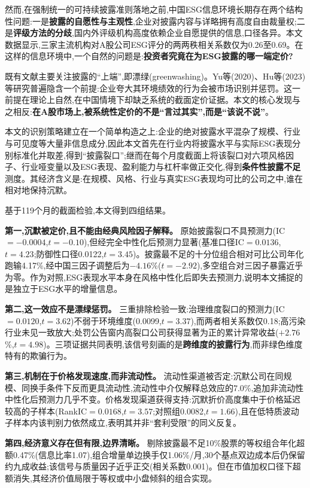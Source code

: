 \documentclass[UTF8, a4paper, fontset=fandol, zihao=-4]{ctexart}
\begin{document}
然而,在强制统一的可持续披露准则落地之前,中国ESG信息环境长期存在两个结构性问题:一是\textbf{披露的自愿性与主观性},企业对披露内容与详略拥有高度自由裁量权;二是\textbf{评级方法的分歧},国内外评级机构高度依赖企业自愿提供的信息,口径各异。本文数据显示,三家主流机构对A股公司ESG评分的两两秩相关系数仅为0.26至0.69。在这样的信息环境中,一个自然的问题是:\textbf{投资者究竟在为ESG披露的哪一端定价?}

既有文献主要关注披露的“上端”,即漂绿(greenwashing)。Yu等(2020)、Hu等(2023)等研究普遍隐含一个前提:企业夸大其环境绩效的行为会被市场识别并惩罚。这一前提在理论上自然,在中国情境下却缺乏系统的截面定价证据。本文的核心发现与之相反:\textbf{在A股市场上,被系统性定价的不是“言过其实”,而是“该说不说”}。

本文的识别策略建立在一个简单构造之上:企业的绝对披露水平混杂了规模、行业与可见度等大量非信息成分,因此本文首先在行业内将披露水平与实际ESG表现分别标准化并取差,得到“披露裂口”;继而在每个月度截面上将该裂口对六项风格因子、行业哑变量以及ESG表现、盈利能力与杠杆率做正交化,得到\textbf{条件性披露不足}测度。其经济含义是:在规模、风格、行业与真实ESG表现均可比的公司之中,谁在相对地保持沉默。

基于119个月的截面检验,本文得到四组结果。

\textbf{第一,沉默被定价,且不能由经典风险因子解释。} 原始披露裂口不具预测力(IC${}=-0.0004$,$t=-0.10$),但经完全中性化后预测力显著(基准口径IC${}=0.0136$,$t=4.23$;防御性口径0.0122,$t=3.45$)。披露最不足的十分位组合相对可比公司年化跑输4.17\%,经中国三因子调整后为$-4.16$\%($t=-2.92$),多空组合对三因子暴露近乎为零。作为对照,ESG表现水平本身在风格中性化后即失去预测力,说明本文捕捉的是独立于ESG水平的增量信息。

\textbf{第二,这一效应不是漂绿惩罚。} 三重排除检验一致:治理维度裂口的预测力(IC${}=0.0120$,$t=3.62$)不弱于环境维度(0.0099,$t=3.37$),而两者相关系数仅0.18;高污染行业未见一致放大;处罚公告窗内高裂口公司获得显著为正的累计异常收益($+2.76$\%,$t=4.98$)。三项证据共同表明,该信号刻画的是\textbf{跨维度的披露行为},而非绿色维度特有的欺骗行为。

\textbf{第三,机制在于价格发现速度,而非流动性。} 流动性渠道被否定:沉默公司在同规模、同换手条件下反而更具流动性,流动性中介仅解释总效应的7.0\%,追加非流动性中性化后预测力几乎不变。价格发现渠道获得支持:沉默折价高度集中于价格延迟较高的子样本(RankIC${}=0.0168$,$t=3.57$;对照组0.0082,$t=1.66$),且在低特质波动子样本内该判别力依然成立,表明其并非“套利受限”的同义反复。

\textbf{第四,经济意义存在但有限,边界清晰。} 剔除披露最不足10\%股票的等权组合年化超额0.47\%(信息比率1.07),组合增量单边换手仅1.06\%/月,30个基点双边成本后仍保留约九成收益;该信号与质量因子近乎正交(相关系数0.001)。但在市值加权口径下超额消失,其经济价值局限于等权或中小盘倾斜的组合实现。
\end{document}

